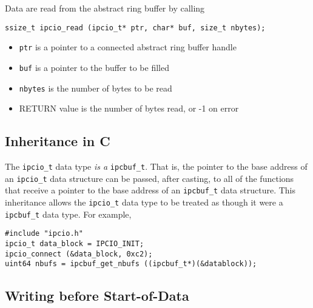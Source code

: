 Data are read from the abstract ring buffer by calling
\begin{verbatim}
ssize_t ipcio_read (ipcio_t* ptr, char* buf, size_t nbytes);
\end{verbatim}
\vspace{-6mm}
\begin{itemize}
\item {\tt ptr} is a pointer to a connected abstract ring buffer handle
\vspace{-2mm}
\item {\tt buf} is a pointer to the buffer to be filled
\vspace{-2mm}
\item {\tt nbytes} is the number of bytes to be read
\vspace{-2mm}
\item RETURN value is the number of bytes read, or -1 on error
\end{itemize}

\subsection{Inheritance in C}

The {\tt ipcio\_t} data type {\em is a} {\tt ipcbuf\_t}.  That is, the
pointer to the base address of an {\tt ipcio\_t} data structure can be
passed, after casting, to all of the functions that receive a pointer
to the base address of an {\tt ipcbuf\_t} data structure.  This
inheritance allows the {\tt ipcio\_t} data type to be treated as
though it were a {\tt ipcbuf\_t} data type. For example,
\begin{verbatim}
#include "ipcio.h"
ipcio_t data_block = IPCIO_INIT;
ipcio_connect (&data_block, 0xc2);
uint64 nbufs = ipcbuf_get_nbufs ((ipcbuf_t*)(&datablock));
\end{verbatim}

\subsection{Writing before Start-of-Data}

